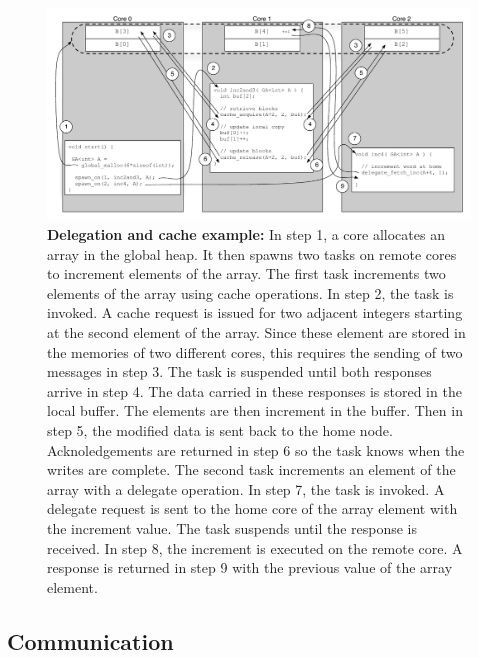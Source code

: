 \begin{figure}[htb]
\begin{center}
  \includegraphics[width=1.5\columnwidth]{figs/delegate-cache}
\begin{minipage}{1.9\columnwidth}
  \caption{\label{fig:delegate-cache} \textbf{Delegation and cache example:} In step 1, a core allocates an array in
the global heap. It then spawns two tasks on remote cores to increment
elements of the array.  The first task increments two elements of the array using cache
operations. In step 2, the task is invoked. A cache request is issued
for two adjacent integers starting at the second element of the
array. Since these element are stored in the memories of two different
cores, this requires the sending of two messages in step 3. The task
is suspended until both responses arrive in step 4. The data carried
in these responses is stored in the local buffer. The elements are
then increment in the buffer. Then in step 5, the modified data is
sent back to the home node. Acknoledgements are returned in step 6 so
the task knows when the writes are complete. The second task increments an element of the array with a delegate
operation. In step 7, the task is invoked. A delegate request is sent
to the home core of the array element with the increment value. The
task suspends until the response is received. In step 8, the increment
is executed on the remote core. A response is returned in step 9 with
the previous value of the array element.
}
\end{minipage}
\vspace{-3ex}
\end{center}
\end{figure}

\subsection{Communication}\label{sec:communication}

